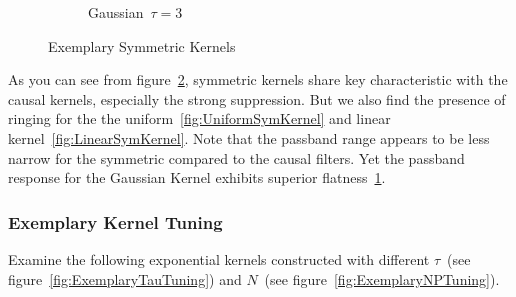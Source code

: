 \documentclass[a4paper]{article}
\newcommand{\figref}[1]{(see figure~\ref{#1})}
\begin{document}
\begin{figure}[hbtp]
\begin{subfigure}{.245\textwidth}
        \caption{Gaussian~$\tau=3$}\label{fig:GaussSymKernel}
    \end{subfigure}
    \caption{Exemplary Symmetric Kernels}\label{fig:ExemplarySymKernels}
\end{figure}

As you can see from figure~\ref{fig:ExemplarySymKernels}, symmetric kernels share key characteristic with the causal kernels, especially the strong suppression. But we also find the presence of ringing for the the uniform~\ref{fig:UniformSymKernel} and linear kernel~\ref{fig:LinearSymKernel}. Note that the passband range appears to be  less narrow for the symmetric compared to the causal filters. Yet the passband response for the Gaussian Kernel exhibits  superior flatness~\ref{fig:GaussSymKernel}.


\subsubsection{Exemplary Kernel Tuning}

Examine the following exponential kernels constructed with different $\tau$~\figref{fig:ExemplaryTauTuning} and $N$~\figref{fig:ExemplaryNPTuning}.
\end{document}
